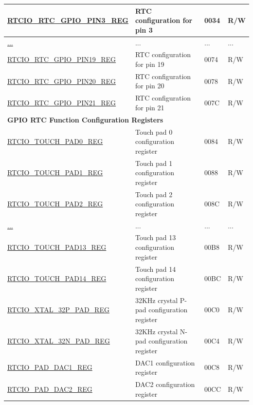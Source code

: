 \begin{longtable}{ | p{6.2cm} | p{7cm} | p{1.3cm} | p{1cm} | }
\hyperref[regdesc:RTCIORTCGPIOPINNREG]{RTCIO\_RTC\_GPIO\_PIN3\_REG} & RTC configuration for pin 3 & \hexprefix{}0034 & R/W \\ \hline
\hyperref[regdesc:RTCIORTCGPIOPINNREG]{...} & ... & ... & ... \\ \hline
\hyperref[regdesc:RTCIORTCGPIOPINNREG]{RTCIO\_RTC\_GPIO\_PIN19\_REG} & RTC configuration for pin 19 & \hexprefix{}0074 & R/W \\ \hline
\hyperref[regdesc:RTCIORTCGPIOPINNREG]{RTCIO\_RTC\_GPIO\_PIN20\_REG} & RTC configuration for pin 20 & \hexprefix{}0078 & R/W \\ \hline
\hyperref[regdesc:RTCIORTCGPIOPINNREG]{RTCIO\_RTC\_GPIO\_PIN21\_REG} & RTC configuration for pin 21 & \hexprefix{}007C & R/W \\ \hline
\multicolumn{4}{|l|}{\textbf{GPIO RTC Function Configuration Registers}} \\ \hline
\hyperref[regdesc:RTCIOTOUCHPADNREG]{RTCIO\_TOUCH\_PAD0\_REG} & Touch pad 0 configuration register & \hexprefix{}0084 & R/W \\ \hline
\hyperref[regdesc:RTCIOTOUCHPADNREG]{RTCIO\_TOUCH\_PAD1\_REG} & Touch pad 1 configuration register & \hexprefix{}0088 & R/W \\ \hline
\hyperref[regdesc:RTCIOTOUCHPADNREG]{RTCIO\_TOUCH\_PAD2\_REG} & Touch pad 2 configuration register & \hexprefix{}008C & R/W \\ \hline
\hyperref[regdesc:RTCIOTOUCHPADNREG]{...} & ... & ... & ... \\ \hline
\hyperref[regdesc:RTCIOTOUCHPADNREG]{RTCIO\_TOUCH\_PAD13\_REG} & Touch pad 13 configuration register & \hexprefix{}00B8 & R/W \\ \hline
\hyperref[regdesc:RTCIOTOUCHPADNREG]{RTCIO\_TOUCH\_PAD14\_REG} & Touch pad 14 configuration register & \hexprefix{}00BC & R/W \\ \hline
\hyperref[regdesc:RTCIOXTAL32PPADREG]{RTCIO\_XTAL\_32P\_PAD\_REG} & 32KHz crystal P-pad configuration register & \hexprefix{}00C0 & R/W \\ \hline
\hyperref[regdesc:RTCIOXTAL32NPADREG]{RTCIO\_XTAL\_32N\_PAD\_REG} & 32KHz crystal N-pad configuration register & \hexprefix{}00C4 & R/W \\ \hline
\hyperref[regdesc:RTCIOPADDAC1REG]{RTCIO\_PAD\_DAC1\_REG} & DAC1 configuration register & \hexprefix{}00C8 & R/W \\ \hline
\hyperref[regdesc:RTCIOPADDAC2REG]{RTCIO\_PAD\_DAC2\_REG} & DAC2 configuration register & \hexprefix{}00CC & R/W \\ \hline

\end{longtable}
